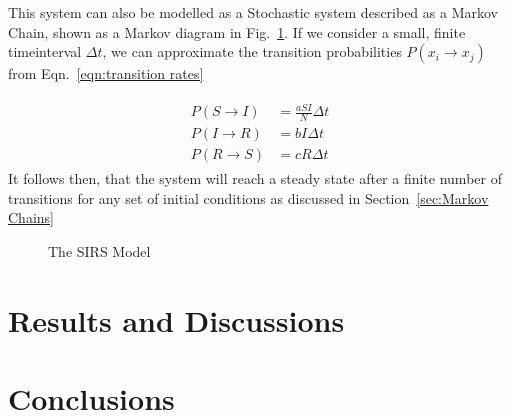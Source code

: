 \documentclass[10pt,showpacs,preprintnumbers,amsmath,amssymb,nofootinbib,aps,prl,twocolumn,groupedaddress,superscriptaddress,showkeys]{revtex4-1}
\begin{document}
    This system can also be modelled as a Stochastic system described as a Markov Chain, shown as a Markov diagram in Fig.~\ref{fig:SIRS diagram}. If we consider a small, finite timeinterval $\Delta t$, we can approximate the transition probabilities $P(x_i \rightarrow x_j)$ from Eqn.~\ref{eqn:transition rates}

    \begin{align}
      \begin{split}
        P(S\rightarrow I) &= \frac{aSI}{N}\Delta t
          \\
        P(I\rightarrow R) &= bI\Delta t
          \\
        P(R\rightarrow S) &= cR\Delta t
      \end{split}
    \end{align}
    It follows then, that the system will reach a steady state after a finite number of transitions for any set of initial conditions as discussed in Section~\ref{sec:Markov Chains}

    \begin{figure}[h!tb]
      \centering 
       \caption{The SIRS Model\label{fig:SIRS diagram}}
    \end{figure}



\section{Results and Discussions}

\section{Conclusions}



\end{document}
